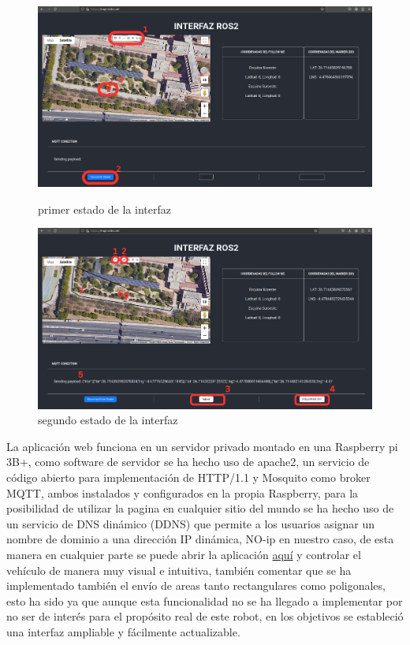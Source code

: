 \begin{figure}[htbp]
  \centering
  \begin{minipage}[b]{0.45\textwidth}
    \centering
    \includegraphics[width=\textwidth]{images/interfaz_1.png}
    \caption{primer estado de la interfaz}
    \label{fig:interfaz_1}
  \end{minipage}
  \hfill
  \begin{minipage}[b]{0.45\textwidth}
    \centering
    \includegraphics[width=\textwidth]{images/interfaz_2.png}
    \caption{segundo estado de la interfaz}
    \label{fig:interfaz_2}
  \end{minipage}
\end{figure}

La aplicación web funciona en un servidor privado montado en una Raspberry pi 3B+, como software de servidor se ha hecho uso de apache2, 
un servicio de código abierto para implementación de HTTP/1.1 y Mosquito como broker MQTT, ambos instalados y configurados en la propia 
Raspberry, para la posibilidad de utilizar la pagina en cualquier sitio del mundo se ha hecho uso de un servicio de DNS dinámico (DDNS) 
que permite a los usuarios asignar un nombre de dominio a una dirección IP dinámica, NO-ip en nuestro caso, de esta manera en cualquier 
parte se puede abrir la aplicación \href{https://mapir.ddns.net}{aquí} y controlar el vehículo de manera muy visual e intuitiva, también 
comentar que se ha implementado también el envío de areas tanto rectangulares como poligonales, esto ha sido ya que aunque esta 
funcionalidad no se ha llegado a implementar por no ser de interés para el propósito real de este robot, en los objetivos se estableció 
una interfaz ampliable y fácilmente actualizable.

